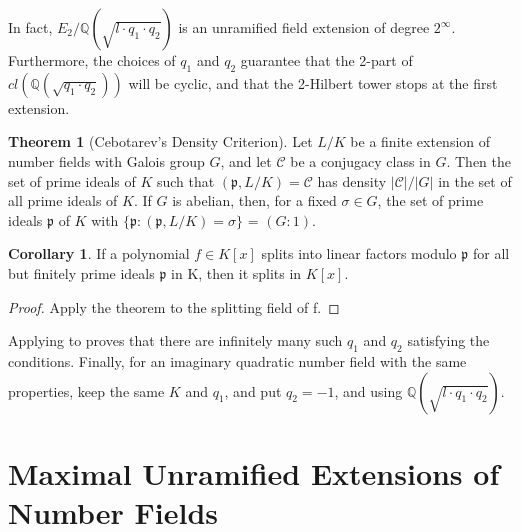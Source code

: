 \documentclass[12pt]{extarticle}
\newcommand{\Q}{\mathbb{Q}}
\newcommand{\<}{\langle}
\renewcommand{\>}{\rangle}
\theoremstyle{definition}
\newtheorem{theorem}{Theorem}
\newtheorem{corollary}{Corollary}
\begin{document}
\begin{center}
\end{center}
In fact, $E_2/\Q(\sqrt{l \cdot q_1 \cdot q_2})$ is an unramified field extension of degree $2^{\infty}$. Furthermore, the choices of $q_1$ and $q_2$ guarantee that the 2-part of $cl(\Q(\sqrt{q_1 \cdot q_2}))$ will be cyclic, and that the 2-Hilbert tower stops at the first extension. 


\begin{theorem}[Cebotarev's Density Criterion]
Let $L/K$ be a finite extension of
number fields with Galois group $G$, and let $\mathcal{C}$ be a conjugacy class in $G$. Then the set of
prime ideals of $K$ such that $(\mathfrak{p},L/K)=\mathcal{C}$ has density $|\mathcal{C}|/|G|$ in the set of all prime
ideals of $K$. If $G$ is abelian, then, for a fixed $\sigma \in G$, the set of prime ideals $\mathfrak{p}$ of $K$ with $\{\mathfrak{p}:(\mathfrak{p},L/K)=\sigma\}$ = $(G:1)$.
\end{theorem}
\begin{corollary}
\label{cor:ceb}
 If a polynomial $f \in K[x]$ splits into linear factors modulo $\mathfrak{p}$ for all but finitely prime ideals $\mathfrak{p}$ in K, then it splits in $K[x]$.
\end{corollary}
\begin{proof}
Apply the theorem to the splitting field of f.
\end{proof}
Applying  to  proves that there are infinitely many such $q_1$ and $q_2$ satisfying the conditions.
Finally, for an imaginary quadratic number field with the same properties, keep the same $K$ and $q_1$, and put $q_2=-1$, and using $\Q(\sqrt{l \cdot q_1 \cdot q_2})$. 




\section{Maximal Unramified Extensions of Number Fields}
\end{document}
